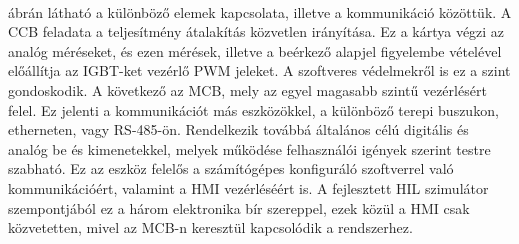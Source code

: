 \paragraph{}
 ábrán látható a különböző elemek kapcsolata, illetve a kommunikáció közöttük. A CCB feladata a teljesítmény átalakítás közvetlen irányítása. Ez a kártya végzi az analóg méréseket, és ezen mérések, illetve a beérkező alapjel figyelembe vételével előállítja az IGBT-ket vezérlő PWM jeleket. A szoftveres védelmekről is ez a szint gondoskodik. A következő az MCB, mely az egyel magasabb szintű vezérlésért felel. Ez jelenti a kommunikációt más eszközökkel, a különböző terepi buszukon, etherneten, vagy RS-485-ön. Rendelkezik továbbá általános célú digitális és analóg be és kimenetekkel, melyek működése felhasználói igények szerint testre szabható. Ez az eszköz felelős a számítógépes konfiguráló szoftverrel való kommunikációért, valamint a HMI vezérléséért is. A fejlesztett HIL szimulátor szempontjából ez a három elektronika bír szereppel, ezek közül a HMI csak közvetetten, mivel az MCB-n keresztül kapcsolódik a rendszerhez.
